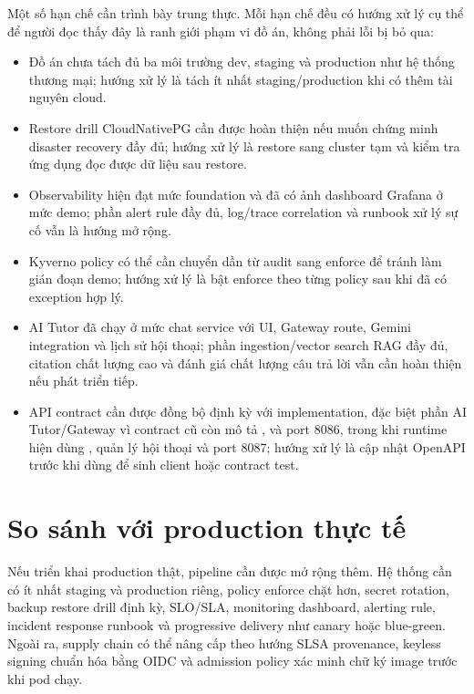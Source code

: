Một số hạn chế cần trình bày trung thực. Mỗi hạn chế đều có hướng xử lý cụ thể để người đọc thấy đây là ranh giới phạm vi đồ án, không phải lỗi bị bỏ qua:

\begin{itemize}
  \item Đồ án chưa tách đủ ba môi trường dev, staging và production như hệ thống thương mại; hướng xử lý là tách ít nhất staging/production khi có thêm tài nguyên cloud.
  \item Restore drill CloudNativePG cần được hoàn thiện nếu muốn chứng minh disaster recovery đầy đủ; hướng xử lý là restore sang cluster tạm và kiểm tra ứng dụng đọc được dữ liệu sau restore.
  \item Observability hiện đạt mức foundation và đã có ảnh dashboard Grafana ở mức demo; phần alert rule đầy đủ, log/trace correlation và runbook xử lý sự cố vẫn là hướng mở rộng.
  \item Kyverno policy có thể cần chuyển dần từ audit sang enforce để tránh làm gián đoạn demo; hướng xử lý là bật enforce theo từng policy sau khi đã có exception hợp lý.
  \item AI Tutor đã chạy ở mức chat service với UI, Gateway route, Gemini integration và lịch sử hội thoại; phần ingestion/vector search RAG đầy đủ, citation chất lượng cao và đánh giá chất lượng câu trả lời vẫn cần hoàn thiện nếu phát triển tiếp.
  \item API contract cần được đồng bộ định kỳ với implementation, đặc biệt phần AI Tutor/Gateway vì contract cũ còn mô tả ,  và port 8086, trong khi runtime hiện dùng , quản lý hội thoại và port 8087; hướng xử lý là cập nhật OpenAPI trước khi dùng để sinh client hoặc contract test.
\end{itemize}

\section{So sánh với production thực tế}

Nếu triển khai production thật, pipeline cần được mở rộng thêm. Hệ thống cần có ít nhất staging và production riêng, policy enforce chặt hơn, secret rotation, backup restore drill định kỳ, SLO/SLA, monitoring dashboard, alerting rule, incident response runbook và progressive delivery như canary hoặc blue-green. Ngoài ra, supply chain có thể nâng cấp theo hướng SLSA provenance, keyless signing chuẩn hóa bằng OIDC và admission policy xác minh chữ ký image trước khi pod chạy.

